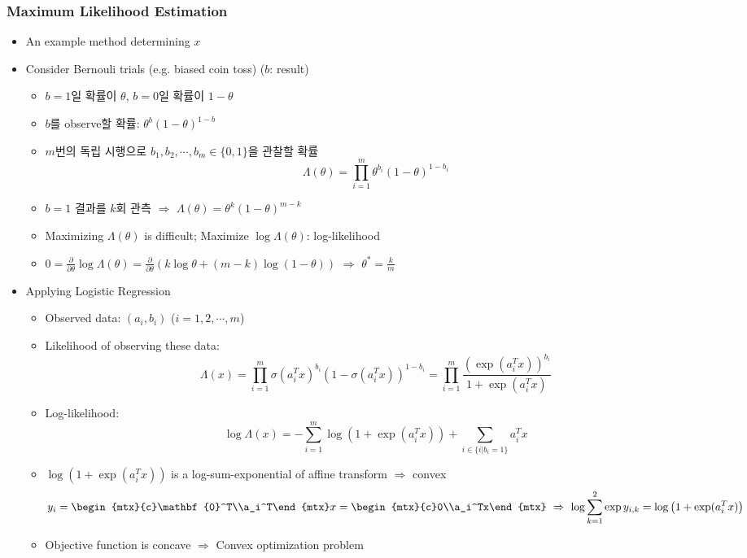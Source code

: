 \subsubsection*{Maximum Likelihood Estimation}
\begin{itemize}
    \item An example method determining $x$
    \item Consider Bernouli trials (e.g. biased coin toss) ($b$: result)
    \begin{itemize}
        \item $b=1$일 확률이 $\theta$, $b=0$일 확률이 $1-\theta$
        \item $b$를 observe할 확률: $\theta^b(1-\theta)^{1-b}$
        \item $m$번의 독립 시행으로 $b_1,b_2,\cdots,b_m\in\{0,1\}$을 관찰할 확률
            $$ \Lambda(\theta)=\prod_{i=1}^m\theta^{b_i}(1-\theta)^{1-b_i} $$
        \item $b=1$ 결과를 $k$회 관측 $\Rightarrow$ $\Lambda(\theta)=\theta^k(1-\theta)^{m-k}$
        \item Maximizing $\Lambda(\theta)$ is difficult; Maximize $\log\Lambda(\theta)$: log-likelihood
        \item $0=\frac\partial{\partial\theta}\log\Lambda(\theta)=\frac\partial{\partial\theta}\left(k\log\theta+(m-k)\log(1-\theta)\right)$ $\Rightarrow$ $\theta^\ast=\frac{k}{m}$
    \end{itemize}
    \item Applying Logistic Regression
    \begin{itemize}
        \item Observed data: $(a_i,b_i)$ ($i=1,2,\cdots,m$)
        \item Likelihood of observing these data:
            $$ \Lambda(x)=\prod_{i=1}^m\sigma(a_i^Tx)^{b_i}\left(1-\sigma(a_i^Tx)\right)^{1-b_i}=\prod_{i=1}^m\frac{\left(\exp(a_i^Tx)\right)^{b_i}}{1+\exp(a_i^Tx)} $$
        \item Log-likelihood:
            $$ \log\Lambda(x)=-\sum_{i=1}^m\log\left(1+\exp(a_i^Tx)\right)+\sum_{i\in\{i|b_i=1\}}a_i^Tx $$
        \item $\log\left(1+\exp(a_i^Tx)\right)$ is a log-sum-exponential of affine transform $\Rightarrow$ convex
            $$ y_i=\begin{mtx}{c}\mathbf{0}^T\\a_i^T\end{mtx}x=\begin{mtx}{c}0\\a_i^Tx\end{mtx}~\Rightarrow~\log\sum_{k=1}^2\exp y_{i,k}=\log\left(1+\exp(a_i^Tx)\right) $$
        \item Objective function is concave $\Rightarrow$ Convex optimization problem
    \end{itemize}
\end{itemize}

